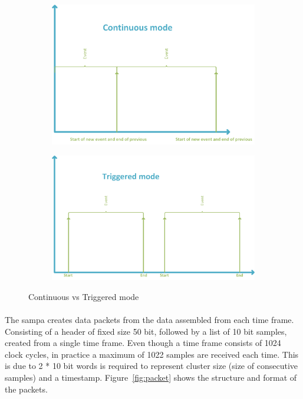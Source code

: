 \documentclass[a4paper]{report}
\begin{document}
\begin{figure}[t!]
	\label{fig:cont-vs-trig}
	\centering
		\begin{subfigure}[]{0.9\textwidth}
			\label{fig:cont}
			\includegraphics[width=\textwidth]{images/cont-mode.png}
		\end{subfigure}
		\begin{subfigure}[]{0.9\textwidth}
			\label{fig:trig}
			\includegraphics[width=\textwidth]{images/triggered-mode.png}
		\end{subfigure}
	\caption{Continuous vs Triggered mode}
\end{figure}

\paragraph{}
The \gls{sampa} creates data packets from the data assembled from each time frame.
Consisting of a header of fixed size 50 bit, followed by a list of 10 bit samples, created from a single time frame.
Even though a time frame consists of 1024 clock cycles, in practice a maximum of 1022 samples are received each time.
This is due to 2 * 10 bit words is required to represent cluster size (size of consecutive samples) and a timestamp.
Figure~\ref{fig:packet} shows the structure and format of the packets.
\end{document}
